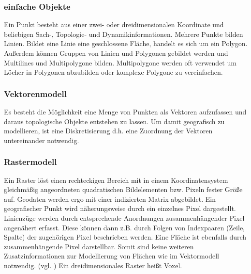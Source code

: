 \subsubsection{einfache Objekte}
Ein Punkt besteht aus einer zwei- oder dreidimensionalen Koordinate und beliebigen Sach-, Topologie- und Dynamikinformationen.
Mehrere Punkte bilden Linien.
Bildet eine Linie eine geschlossene Fläche, handelt es sich um ein Polygon.
Außerdem können Gruppen von Linien und Polygonen gebildet werden und Multilines und Multipolygone bilden.
Multipolygone werden oft verwendet um Löcher in Polygonen abzubilden oder komplexe Polygone zu vereinfachen.

\subsubsection{Vektorenmodell}

Es besteht die Möglichkeit eine Menge von Punkten als Vektoren aufzufassen und daraus topologische Objekte entstehen zu lassen.
Um damit geografisch zu modellieren, ist eine Diskretisierung d.h. eine Zuordnung der Vektoren untereinander notwendig. 

\subsubsection{Rastermodell}
Ein Raster löst einen rechteckigen Bereich mit in einem Koordinatensystem gleichmäßig angeordneten quadratischen Bildelementen bzw. Pixeln fester Größe auf.
Geodaten werden ergo mit einer indizierten Matrix abgebildet.
Ein geografischer Punkt wird näherungsweise durch ein einzelnes Pixel dargestellt.
Linienzüge werden durch entsprechende Anordnungen zusammenhängender Pixel angenähert erfasst.
Diese können dann z.B. durch Folgen von Indexpaaren (Zeile, Spalte) der zugehörigen Pixel beschrieben werden.
Eine Fläche ist ebenfalls durch zusammenhängende Pixel darstellbar.
Somit sind keine weiteren Zusatzinformationen zur Modellierung von Flächen wie im Vektormodell notwendig. (vgl. \cite[S.136]{book:gi-theopluspraxis3})
Ein dreidimensionales Raster heißt Voxel.

